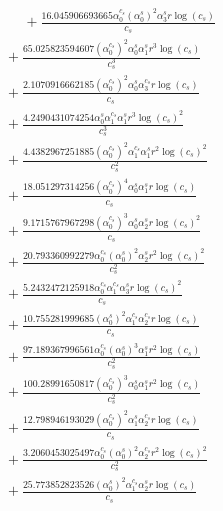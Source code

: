 \documentclass[10pt]{article}
\begin{document}
\begin{align*}
\phantom{R_{3,8}} &\phantom{={}}{}  + \frac{16.045906693665 \alpha_{0}^{c_s} \left(\alpha_{0}^s\right)^{2} \alpha_{3}^s r \log{\left(c_{s} \right)}}{c_{s}} \\
&{}  + \frac{65.025823594607 \left(\alpha_{0}^{c_s}\right)^{2} \alpha_{0}^s \alpha_{1}^s r^{3} \log{\left(c_{s} \right)}}{c_{s}^{3}} \\
&{}  + \frac{2.1070916662185 \left(\alpha_{0}^{c_s}\right)^{2} \alpha_{0}^s \alpha_{3}^{c_s} r \log{\left(c_{s} \right)}}{c_{s}} \\
&{}  + \frac{4.2490431074254 \alpha_{0}^s \alpha_{1}^{c_s} \alpha_{1}^s r^{3} \log{\left(c_{s} \right)}^{2}}{c_{s}^{3}} \\
&{}  + \frac{4.4382967251885 \left(\alpha_{0}^{c_s}\right)^{2} \alpha_{1}^{c_s} \alpha_{1}^s r^{2} \log{\left(c_{s} \right)}^{2}}{c_{s}^{2}} \\
&{}  + \frac{18.051297314256 \left(\alpha_{0}^{c_s}\right)^{4} \alpha_{0}^s \alpha_{1}^s r \log{\left(c_{s} \right)}}{c_{s}} \\
&{}  + \frac{9.1715767967298 \left(\alpha_{0}^{c_s}\right)^{3} \alpha_{0}^s \alpha_{2}^s r \log{\left(c_{s} \right)}^{2}}{c_{s}} \\
&{}  + \frac{20.793360992279 \alpha_{0}^{c_s} \left(\alpha_{0}^s\right)^{2} \alpha_{2}^s r^{2} \log{\left(c_{s} \right)}^{2}}{c_{s}^{2}} \\
&{}  + \frac{5.2432472125918 \alpha_{0}^{c_s} \alpha_{1}^{c_s} \alpha_{3}^s r \log{\left(c_{s} \right)}^{2}}{c_{s}} \\
&{}  + \frac{10.755281999685 \left(\alpha_{0}^s\right)^{2} \alpha_{1}^{c_s} \alpha_{2}^{c_s} r \log{\left(c_{s} \right)}}{c_{s}} \\
&{}  + \frac{97.189367996561 \alpha_{0}^{c_s} \left(\alpha_{0}^s\right)^{3} \alpha_{1}^s r^{2} \log{\left(c_{s} \right)}}{c_{s}^{2}} \\
&{}  + \frac{100.28991650817 \left(\alpha_{0}^{c_s}\right)^{3} \alpha_{0}^s \alpha_{1}^s r^{2} \log{\left(c_{s} \right)}}{c_{s}^{2}} \\
&{}  + \frac{12.798946193029 \left(\alpha_{0}^{c_s}\right)^{2} \alpha_{1}^s \alpha_{2}^{c_s} r \log{\left(c_{s} \right)}}{c_{s}} \\
&{}  + \frac{3.2060453025497 \alpha_{0}^{c_s} \left(\alpha_{0}^s\right)^{2} \alpha_{2}^{c_s} r^{2} \log{\left(c_{s} \right)}^{2}}{c_{s}^{2}} \\
&{}  + \frac{25.773852823526 \left(\alpha_{0}^s\right)^{2} \alpha_{1}^{c_s} \alpha_{2}^s r \log{\left(c_{s} \right)}}{c_{s}} \\

\end{align*}
\end{document}
